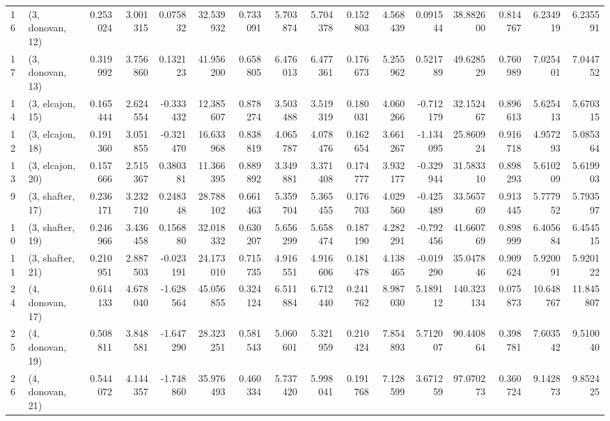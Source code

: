 \begin{tabular}{llrrrrrrrrrrrrrr}
16 &  (3, donovan, 12) &   0.253024 &  3.001315 &  0.075832 &  32.539932 &  0.733091 &   5.703874 &  5.704378 &  0.152803 &  4.568439 &  0.091544 &   38.882600 &  0.814767 &   6.234919 &   6.235591 \\
17 &  (3, donovan, 13) &   0.319992 &  3.756860 &  0.132123 &  41.956200 &  0.658805 &   6.476013 &  6.477361 &  0.176673 &  5.255962 &  0.521789 &   49.628529 &  0.760989 &   7.025401 &   7.044752 \\
14 &  (3, elcajon, 15) &   0.165444 &  2.624554 & -0.333432 &  12.385607 &  0.878274 &   3.503488 &  3.519319 &  0.180031 &  4.060266 & -0.712179 &   32.152467 &  0.896613 &   5.625413 &   5.670315 \\
12 &  (3, elcajon, 18) &   0.191360 &  3.051855 & -0.321470 &  16.633968 &  0.838819 &   4.065787 &  4.078476 &  0.162654 &  3.661267 & -1.134095 &   25.860924 &  0.916718 &   4.957293 &   5.085364 \\
13 &  (3, elcajon, 20) &   0.157666 &  2.515367 &  0.380381 &  11.366395 &  0.889892 &   3.349881 &  3.371408 &  0.174777 &  3.932177 & -0.329944 &   31.583310 &  0.898293 &   5.610209 &   5.619903 \\
9  &  (3, shafter, 17) &   0.236171 &  3.232710 &  0.248348 &  28.788102 &  0.661463 &   5.359704 &  5.365455 &  0.176703 &  4.029560 & -0.425489 &   33.565769 &  0.913445 &   5.777952 &   5.793597 \\
10 &  (3, shafter, 19) &   0.246966 &  3.436458 &  0.156880 &  32.018332 &  0.630207 &   5.656299 &  5.658474 &  0.187190 &  4.282291 & -0.792456 &   41.660769 &  0.898999 &   6.405684 &   6.454515 \\
11 &  (3, shafter, 21) &   0.210951 &  2.887503 & -0.023191 &  24.173010 &  0.715735 &   4.916551 &  4.916606 &  0.181478 &  4.138465 & -0.019290 &   35.047846 &  0.909624 &   5.920091 &   5.920122 \\
24 &  (4, donovan, 17) &   0.614133 &  4.678040 & -1.628564 &  45.056855 &  0.324124 &   6.511884 &  6.712440 &  0.241762 &  8.987030 &  5.189112 &  140.323134 &  0.075873 &  10.648767 &  11.845807 \\
25 &  (4, donovan, 19) &   0.508811 &  3.848581 & -1.647290 &  28.323251 &  0.581543 &   5.060601 &  5.321959 &  0.210424 &  7.854893 &  5.712007 &   90.440864 &  0.398781 &   7.603542 &   9.510040 \\
26 &  (4, donovan, 21) &   0.544072 &  4.144357 & -1.748860 &  35.976493 &  0.460334 &   5.737420 &  5.998041 &  0.191768 &  7.128599 &  3.671259 &   97.070273 &  0.360724 &   9.142873 &   9.852425 \\

\end{tabular}
